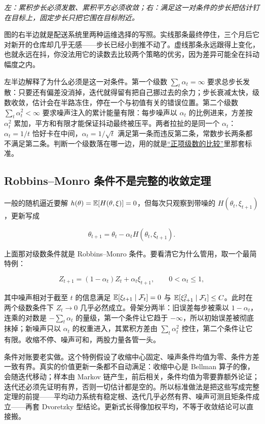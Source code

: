 \emph{左：累积步长必须发散、累积平方必须收敛；右：满足这一对条件的步长把估计钉在目标上，固定步长只把它围在目标附近。}

图的右半边就是配送系统里两种运维选择的写照。实线那条最终停住，三个月后它对新开的仓库却几乎无感——步长已经小到推不动了。虚线那条永远跟得上变化，也就永远在抖，你没法用它的读数去比较两个策略的优劣，因为差异可能全在抖动幅度之内。

左半边解释了为什么必须是这一对条件。第一个级数 \(\sum_t\alpha_t=\infty\) 要求总步长发散：只要还有偏差没消掉，迭代就得留有把自己挪过去的余力；步长衰减太快，级数收敛，估计会在半路冻住，停在一个与初值有关的错误位置。第二个级数 \(\sum_t\alpha_t^2<\infty\) 要求噪声注入的累计能量有限：每步噪声以 \(\alpha_t\) 的比例进来，方差按 \(\alpha_t^2\) 累加，平方和有限才能保证抖动最终被压平。两者拉扯的是同一个 \(\alpha_t\)：\(\alpha_t=1/t\) 恰好卡在中间，\(\alpha_t=1/\sqrt{t}\) 满足第一条而违反第二条，常数步长两条都不满足第二条。判断一个级数落在哪一边，用的就是\hyperref[sec:02-Calculus/05-Sequences-and-Series/03]{``正项级数的比较''}里那套标准。

\subsection{Robbins--Monro 条件不是完整的收敛定理}

一般的随机逼近要解 \(h(\theta)=\mathbb{E}[H(\theta,\xi)]=0\)，但每次只观察到带噪的 \(H(\theta_t,\xi_{t+1})\)，更新写成

\[
\theta_{t+1}=\theta_t-\alpha_tH(\theta_t,\xi_{t+1}).
\]

上面那对级数条件就是 Robbins--Monro 条件。要看清它为什么管用，取一个最简特例：

\[
Z_{t+1}=(1-\alpha_t)Z_t+\alpha_t\xi_{t+1},
\qquad 0<\alpha_t\le 1,
\]

其中噪声相对于截至 \(t\) 的信息满足 \(\mathbb{E}[\xi_{t+1}\mid\mathcal F_t]=0\) 与 \(\mathbb{E}[\xi_{t+1}^2\mid\mathcal F_t]\le C\)。此时在两个级数条件下 \(Z_t\to 0\) 几乎必然成立。骨架分两半：旧误差每步被乘以 \(1-\alpha_t\)，连乘的对数是 \(-\sum_t\alpha_t\) 的量级，第一个条件让它趋于 \(-\infty\)，所以初始误差被彻底抹掉；新噪声只以 \(\alpha_t\) 的权重进入，其累积方差由 \(\sum_t\alpha_t^2\) 控住，第二个条件让它有限。收缩不停、噪声可和，两股力量各管一头。

条件对账要老实做。这个特例假设了收缩中心固定、噪声条件均值为零、条件方差一致有界。真实的价值更新一条都不自动满足：收缩中心是 Bellman 算子的像，会随迭代移动；样本由 Markov 链产生，前后相关，条件均值为零要靠额外论证；迭代还必须先证明有界，否则一切估计都是空的。所以标准做法是把这些写成完整定理的前提——平均动力系统有稳定根、迭代几乎必然有界、噪声可测且矩条件成立——再套 Dvoretzky 型结论。更新式长得像加权平均，不等于收敛结论可以直接搬。

